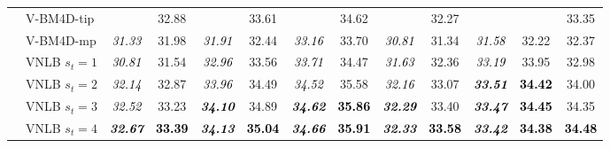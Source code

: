\documentclass[10pt, journal, twocolumn, final, a4paper]{IEEEtran}
\newcommand{\best}[1]{#1}
\newcommand{\bsic}[1]{\textcolor{black}{\textit{#1}}}
\newcommand{\Bsic}[1]{\textcolor{black}{\textbf{\textit{#1}}}}
\newcommand{\Best}[1]{\textbf{\textcolor{black}{#1}}}
\begin{document}
\begin{table}[htp!]
\begin{center}
{\begin{tabular}{ c | l |c c | c c | c c | c c | c c | c}
			                      & V-BM4D-tip           & \bsic{     } & \best{32.88} & \bsic{     } & \best{33.61} & \bsic{     } & \best{34.62} & \bsic{     } & \best{32.27} & \bsic{     } & \best{     } & \best{33.35} \\
			                      & V-BM4D-mp            & \bsic{31.33} &       31.98  & \bsic{31.91} &       32.44  & \bsic{33.16} &       33.70  & \bsic{30.81} &       31.34  & \bsic{31.58} &       32.22  &       32.37  \\
			                      & VNLB   $s_t = 1$     & \bsic{30.81} &       31.54  & \bsic{32.96} &       33.56  & \bsic{33.71} &       34.47  & \bsic{31.63} &       32.36  & \bsic{33.19} &       33.95  &       32.98  \\
			                      & VNLB   $s_t = 2$     & \bsic{32.14} &       32.87  & \bsic{33.96} &       34.49  & \bsic{34.52} &       35.58  & \bsic{32.16} &       33.07  & \Bsic{33.51} & \Best{34.42} &       34.00  \\
			                      & VNLB   $s_t = 3$     & \bsic{32.52} &       33.23  & \Bsic{34.10} &       34.89  & \Bsic{34.62} & \Best{35.86} & \Bsic{32.29} &       33.40  & \Bsic{33.47} & \Best{34.45} &       34.35  \\
			                      & VNLB   $s_t = 4$     & \Bsic{32.67} & \Best{33.39} & \Bsic{34.13} & \Best{35.04} & \Bsic{34.66} & \Best{35.91} & \Bsic{32.33} & \Best{33.58} & \Bsic{33.42} & \Best{34.38} & \Best{34.48} \\\hline

\end{tabular}}
\end{center}
\end{table}
\end{document}
